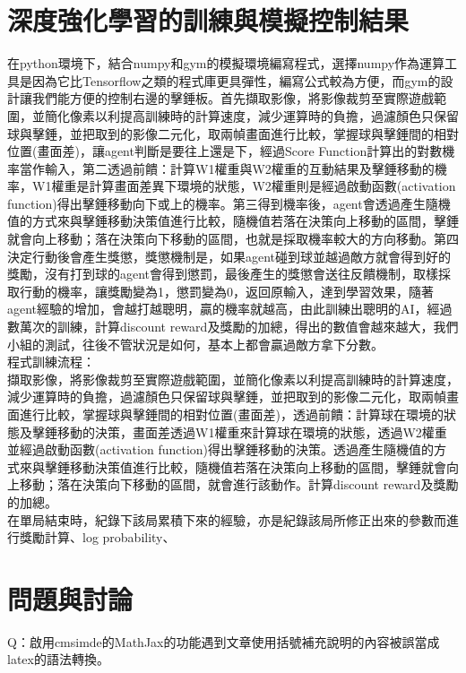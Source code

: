 \documentclass[14pt,a4paper]{report}  %
\begin{document}
\chapter{深度強化學習的訓練與模擬控制結果}
\qquad 在python環境下，結合numpy和gym的模擬環境編寫程式，選擇numpy作為運算工具是因為它比Tensorflow之類的程式庫更具彈性，編寫公式較為方便，而gym的設計讓我們能方便的控制右邊的擊錘板。首先擷取影像，將影像裁剪至實際遊戲範圍，並簡化像素以利提高訓練時的計算速度，減少運算時的負擔，過濾顏色只保留球與擊錘，並把取到的影像二元化，取兩幀畫面進行比較，掌握球與擊錘間的相對位置(畫面差)，讓agent判斷是要往上還是下，經過Score Function計算出的對數機率當作輸入，第二透過前饋：計算W1權重與W2權重的互動結果及擊錘移動的機率，W1權重是計算畫面差異下環境的狀態，W2權重則是經過啟動函數(activation function)得出擊錘移動向下或上的機率。第三得到機率後，agent會透過產生隨機值的方式來與擊錘移動決策值進行比較，隨機值若落在決策向上移動的區間，擊錘就會向上移動；落在決策向下移動的區間，也就是採取機率較大的方向移動。第四決定行動後會產生獎懲，獎懲機制是，如果agent碰到球並越過敵方就會得到好的獎勵，沒有打到球的agent會得到懲罰，最後產生的獎懲會送往反饋機制，取樣採取行動的機率，讓獎勵變為1，懲罰變為0，返回原輸入，達到學習效果，隨著agent經驗的增加，會越打越聰明，贏的機率就越高，由此訓練出聰明的AI，經過數萬次的訓練，計算discount reward及獎勵的加總，得出的數值會越來越大，我們小組的測試，往後不管狀況是如何，基本上都會贏過敵方拿下分數。\\[12pt]

程式訓練流程：\\
\qquad 擷取影像，將影像裁剪至實際遊戲範圍，並簡化像素以利提高訓練時的計算速度，減少運算時的負擔，過濾顏色只保留球與擊錘，並把取到的影像二元化，取兩幀畫面進行比較，掌握球與擊錘間的相對位置(畫面差)，透過前饋：計算球在環境的狀態及擊錘移動的決策，畫面差透過W1權重來計算球在環境的狀態，透過W2權重並經過啟動函數(activation function)得出擊錘移動的決策。透過產生隨機值的方式來與擊錘移動決策值進行比較，隨機值若落在決策向上移動的區間，擊錘就會向上移動；落在決策向下移動的區間，就會進行該動作。計算discount reward及獎勵的加總。\\

\qquad 在單局結束時，紀錄下該局累積下來的經驗，亦是紀錄該局所修正出來的參數而進行獎勵計算、log probability、\\

\newpage
\chapter{問題與討論}
Q：啟用cmsimde的MathJax的功能遇到文章使用括號補充說明的內容被誤當成latex的語法轉換。\\
\end{document}
